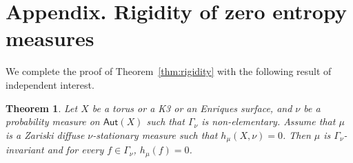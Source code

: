 \documentclass[JEP,XML,SOM,Unicode,published]{cedram}
\newcommand\Aut{\mathsf{Aut}}
\theoremstyle{plain}
\newtheorem{thm}{Theorem}[section]
\theoremstyle{definition}
\begin{document}
\appendix
{}\label{app:zero_entropy}
\section*{Appendix. Rigidity of zero entropy measures}

We complete the proof of Theorem~\ref{thm:rigidity} with the following result
of independent interest.\vspace*{-5pt}\enlargethispage{.5\baselineskip}%

\begin{thm}\label{thm:entropy_every_f}
Let $X$ be a torus or a K3 or an Enriques surface,
and $\nu$ be a probability measure on
$\Aut(X)$ such that $\Gamma_\nu$ is non-elementary. Assume that $\mu$ is a Zariski diffuse
$\nu$-stationary measure such that $h_\mu(X, \nu) = 0$.
Then $\mu$ is $\Gamma_\nu$-invariant and for every
$f\in \Gamma_\nu$, $h_\mu(f)=0$.
\end{thm}
\end{document}
